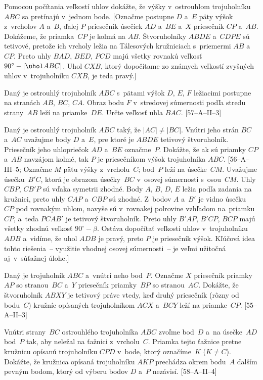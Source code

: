 {
Pomocou počítania veľkostí uhlov dokážte, že výšky v~ostrouhlom
trojuholníku $ABC$ sa pretínajú v~jednom bode. [Označme postupne $D$ a~$E$
päty výšok z~vrcholov $A$ a~$B$, ďalej $P$ priesečník úsečiek $AD$
a~$BE$ a~$X$ priesečník $CP$ a~$AB$. Dokážeme, že priamka~$CP$ je kolmá
na $AB$. Štvoruholníky $ABDE$ a~$CDPE$ sú tetivové, pretože ich vrcholy
ležia na Tálesových kružniciach s~priemermi $AB$ a~$CP$. Preto uhly
$BAD$, $BED$, $PCD$ majú všetky rovnakú veľkosť $90^\circ-|\uhol ABC|$. Uhol
$CXB$, ktorý dopočítame zo známych veľkostí zvyšných uhlov
v~trojuholníku $CXB$, je teda pravý.]

Daný je ostrouhlý trojuholník $ABC$ s~pätami výšok $D$, $E$, $F$ ležiacimi postupne na stranách $AB$, $BC$, $CA$.
Obraz bodu $F$ v~stredovej súmernosti podľa stredu strany~$AB$ leží na priamke~$DE$. Určte veľkosť uhla $BAC$.
[57--A--II--3]

Daný je ostrouhlý trojuholník $ABC$ taký, že $|AC|\ne |BC|$.
Vnútri jeho strán $BC$ a~$AC$ uvažujme body $D$ a~$E$, pre ktoré je
$ABDE$ tetivový štvoruholník. Priesečník jeho uhlopriečok $AD$ a~$BE$
označme~$P$. Dokážte, že ak sú priamky $CP$ a~$AB$ navzájom kolmé, tak $P$
je priesečníkom výšok trojuholníka $ABC$.
[\hbox{56--A--III--5};
Označme $M$ pätu výšky z~vrcholu~$C$; bod~$P$ leží na
úsečke~$CM$. Uvažujme úsečku~$B'C$, ktorá je obrazom úsečky~$BC$
v~osovej súmernosti s~osou~$CM$. Uhly $CBP$, $CB'P$ sú vďaka symetrii
zhodné. Body $A$, $B$, $D$, $E$ ležia podľa zadania na kružnici, preto
uhly $CAP$ a~$CBP$ sú zhodné. Z~bodov $A$ a~$B'$ je vidno úsečku~$CP$ pod
rovnakým uhlom, navyše sú v~rovnakej polrovine vzhľadom na~priamku~$CP$, a~teda $PCAB'$ je tetivový štvoruholník. Preto uhly $B'AP$,
$B'CP$, $BCP$ majú všetky zhodnú veľkosť $90^\circ-\beta$. Ostáva
dopočítať veľkosti uhlov v~trojuholníku $ADB$ a~vidíme, že uhol $ADB$
je pravý, preto $P$ je priesečník výšok. Kľúčová idea tohto riešenia~--
využitie vhodnej osovej súmernosti~-- je veľmi užitočná aj~v~súťažnej úlohe.]

Daný je trojuholník $ABC$ a~vnútri neho bod~$P$. Označme $X$ priesečník
priamky~$AP$ so stranou~$BC$ a~$Y$ priesečník priamky~$BP$ so stranou~$AC$.
Dokážte, že štvoruholník $ABXY$ je tetivový práve vtedy, keď druhý
priesečník (rôzny od bodu~$C$) kružníc opísaných trojuholníkom $ACX$ a~$BCY$ leží na
priamke~$CP$.
[55--A--II--3]

Vnútri strany~$BC$ ostrouhlého trojuholníka $ABC$ zvoľme bod~$D$ a~na úsečke~$AD$ bod~$P$ tak, aby neležal na ťažnici z~vrcholu~$C$. Priamka tejto ťažnice pretne kružnicu opísanú trojuholníku $CPD$ v~bode, ktorý označíme~$K$ ($K\ne C$).
Dokážte, že kružnica opísaná trojuholníku $AKP$ prechádza okrem bodu~$A$ ďalším pevným bodom, ktorý od výberu bodov $D$ a~$P$ nezávisí.
[58--A--II--4]

}
